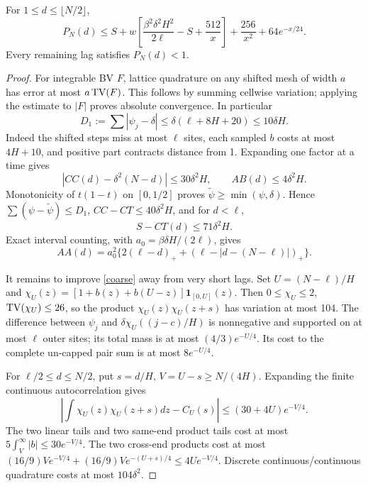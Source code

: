 \begin{lemma}\label{structured}
For \(1\le d\le\lfloor N/2\rfloor\),
\begin{equation}
 P_N(d)\le S+w\left[
 \frac{\beta^2\delta^2H^2}{2\ell}-S+\frac{512}{x}\right]
 +\frac{256}{x^2}+64e^{-x/24}. \label{structuredineq}
\end{equation}
Every remaining lag satisfies \(P_N(d)<1\).
\end{lemma}
\begin{proof}
For integrable BV \(F\), lattice quadrature on any shifted mesh of width \(a\)
has error at most \(a\operatorname{TV}(F)\). This follows by summing cellwise variation;
applying the estimate to \(|F|\) proves absolute convergence. In particular
\begin{equation}
 D_1:=\sum|\psi_j-\delta|
 \le\delta(\ell+8H+20)\le10\delta H. \label{L1}
\end{equation}
Indeed the shifted steps miss at most \(\ell\) sites, each sampled \(b\)
costs at most \(4H+10\), and positive part contracts distance from 1.
Expanding one factor at a time gives
\begin{equation}
 |CC(d)-\delta^2(N-d)|\le30\delta^2H,
 \qquad AB(d)\le4\delta^2H. \label{coarse}
\end{equation}
Monotonicity of \(t(1-t)\) on \([0,1/2]\) proves
\(\widetilde\psi\ge\min(\psi,\delta)\).
Hence \(\sum(\psi-\widetilde\psi)\le D_1\),
\(CC-CT\le40\delta^2H\), and for \(d<\ell\),
\begin{equation}
 S-CT(d)\le71\delta^2H. \label{hole}
\end{equation}
Exact interval counting, with \(a_0=\beta\delta H/(2\ell)\), gives
\begin{equation}
 AA(d)=a_0^2\{2(\ell-d)_++(\ell-|d-(N-\ell)|)_+\}. \label{atoms}
\end{equation}

It remains to improve \eqref{coarse} away from very short lags. Set
\(U=(N-\ell)/H\) and
\(\chi_U(z)=[1+b(z)+b(U-z)]\mathbf1_{[0,U]}(z)\).
Then \(0\le\chi_U\le2\), \(\operatorname{TV}(\chi_U)\le26\), so the product
\(\chi_U(z)\chi_U(z+s)\) has variation at most 104.
The difference between \(\psi_j\) and \(\delta\chi_U((j-c)/H)\)
is nonnegative and supported on at most \(\ell\) outer sites; its total
mass is at most \((4/3)e^{-U/4}\). Its cost to the complete un-capped
pair sum is at most \(8e^{-U/4}\).

For \(\ell/2\le d\le N/2\), put \(s=d/H\), \(V=U-s\ge N/(4H)\).
Expanding the finite continuous autocorrelation gives
\begin{equation}
 \left|\int\chi_U(z)\chi_U(z+s)dz-C_U(s)\right|
 \le(30+4U)e^{-V/4}. \label{finitecorr}
\end{equation}
The two linear tails and two same-end product tails cost at most
\(5\int_V^\infty|b|\le30e^{-V/4}\).
The two cross-end products cost at most
\((16/9)V e^{-V/4}+(16/9)V e^{-(U+s)/4}\le4Ue^{-V/4}\).
Discrete continuous/continuous quadrature costs at most \(104\delta^2\).


\end{proof}
